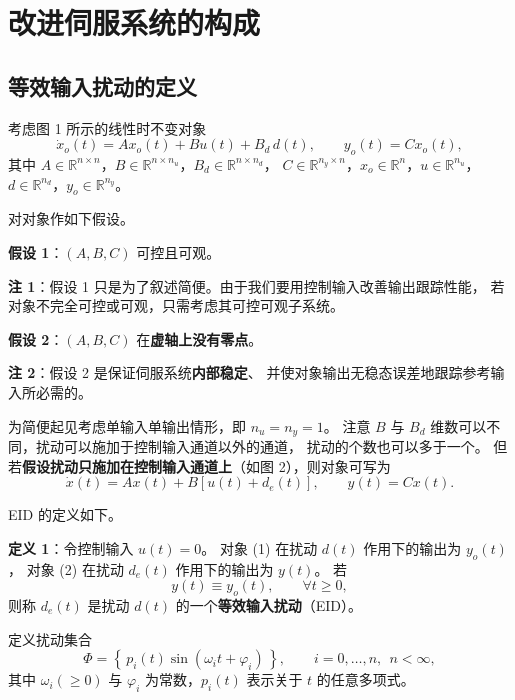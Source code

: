 \documentclass[11pt,a4paper]{ctexart}
\newcommand{\R}{\mathbb{R}}
\begin{document}
\section{改进伺服系统的构成}

\subsection{等效输入扰动的定义}

考虑图 1 所示的线性时不变对象
\begin{equation}
\dot x_o(t)=A x_o(t)+B u(t)+B_d\,d(t),\qquad
y_o(t)=C x_o(t),
\end{equation}
其中 $A\in\R^{n\times n}$，$B\in\R^{n\times n_u}$，$B_d\in\R^{n\times n_d}$，
$C\in\R^{n_y\times n}$，$x_o\in\R^{n}$，$u\in\R^{n_u}$，$d\in\R^{n_d}$，$y_o\in\R^{n_y}$。

对对象作如下假设。

\textbf{假设 1}：$(A,B,C)$ 可控且可观。

\textbf{注 1}：假设 1 只是为了叙述简便。由于我们要用控制输入改善输出跟踪性能，
若对象不完全可控或可观，只需考虑其可控可观子系统。

\textbf{假设 2}：$(A,B,C)$ 在\textbf{虚轴上没有零点}。

\textbf{注 2}：假设 2 是保证伺服系统\textbf{内部稳定}、
并使对象输出无稳态误差地跟踪参考输入所必需的。

为简便起见考虑单输入单输出情形，即 $n_u=n_y=1$。
注意 $B$ 与 $B_d$ 维数可以不同，扰动可以施加于控制输入通道以外的通道，
扰动的个数也可以多于一个。
但若\textbf{假设扰动只施加在控制输入通道上}（如图 2），则对象可写为
\begin{equation}
\dot x(t)=A x(t)+B\left[u(t)+d_e(t)\right],\qquad
y(t)=C x(t).
\end{equation}

EID 的定义如下。

\textbf{定义 1}：令控制输入 $u(t)=0$。
对象 (1) 在扰动 $d(t)$ 作用下的输出为 $y_o(t)$，
对象 (2) 在扰动 $d_e(t)$ 作用下的输出为 $y(t)$。
若
\begin{equation}
y(t)\equiv y_o(t),\qquad \forall t\ge 0,
\end{equation}
则称 $d_e(t)$ 是扰动 $d(t)$ 的一个\textbf{等效输入扰动}（EID）。

定义扰动集合
\begin{equation}
\Phi=\left\{\,p_i(t)\sin(\omega_i t+\varphi_i)\,\right\},\qquad i=0,\dots,n,\ \ n<\infty,
\end{equation}
其中 $\omega_i(\ge 0)$ 与 $\varphi_i$ 为常数，$p_i(t)$ 表示关于 $t$ 的任意多项式。
\end{document}
